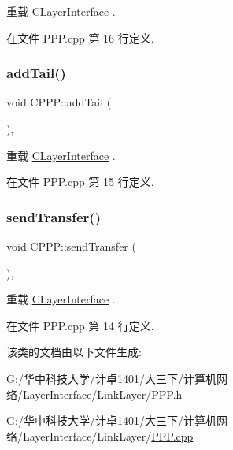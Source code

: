 重载 \hyperlink{class_c_layer_interface_ac38c51660960657ac42e37a19ea062b4}{C\+Layer\+Interface} .



在文件 P\+P\+P.\+cpp 第 16 行定义.

\mbox{\label{class_c_p_p_p_a2b345908338ada3b4d9e58d14270725a}} 
\subsubsection{\texorpdfstring{add\+Tail()}{addTail()}}
{\footnotesize\ttfamily void C\+P\+P\+P\+::add\+Tail (\begin{DoxyParamCaption}{ }\end{DoxyParamCaption})\hspace{0.3cm}{\ttfamily [protected]}, {\ttfamily [virtual]}}



重载 \hyperlink{class_c_layer_interface_a433a6f3322355291bbfc2b97343d493f}{C\+Layer\+Interface} .



在文件 P\+P\+P.\+cpp 第 15 行定义.

\mbox{\label{class_c_p_p_p_a1d8be0d39e44ad6e6971329106e5900d}} 
\subsubsection{\texorpdfstring{send\+Transfer()}{sendTransfer()}}
{\footnotesize\ttfamily void C\+P\+P\+P\+::send\+Transfer (\begin{DoxyParamCaption}{ }\end{DoxyParamCaption})\hspace{0.3cm}{\ttfamily [protected]}, {\ttfamily [virtual]}}



重载 \hyperlink{class_c_layer_interface_a02a144b97e69df2dc47149e5314cba2d}{C\+Layer\+Interface} .



在文件 P\+P\+P.\+cpp 第 14 行定义.



该类的文档由以下文件生成\+:\begin{DoxyCompactItemize}
\item 
G\+:/华中科技大学/计卓1401/大三下/计算机网络/\+Layer\+Interface/\+Link\+Layer/\hyperlink{_p_p_p_8h}{P\+P\+P.\+h}\item 
G\+:/华中科技大学/计卓1401/大三下/计算机网络/\+Layer\+Interface/\+Link\+Layer/\hyperlink{_p_p_p_8cpp}{P\+P\+P.\+cpp}\end{DoxyCompactItemize}
